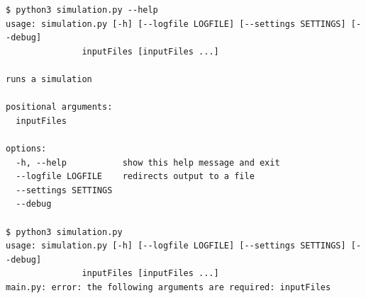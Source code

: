 
\begin{frame}[fragile]
%
\begin{cmdbox}
\begin{verbatim}
$ python3 simulation.py --help
usage: simulation.py [-h] [--logfile LOGFILE] [--settings SETTINGS] [--debug]
               inputFiles [inputFiles ...]

runs a simulation

positional arguments:
  inputFiles

options:
  -h, --help           show this help message and exit
  --logfile LOGFILE    redirects output to a file
  --settings SETTINGS
  --debug

$ python3 simulation.py 
usage: simulation.py [-h] [--logfile LOGFILE] [--settings SETTINGS] [--debug]
               inputFiles [inputFiles ...]
main.py: error: the following arguments are required: inputFiles

\end{verbatim}
\end{cmdbox}
%
\end{frame}


